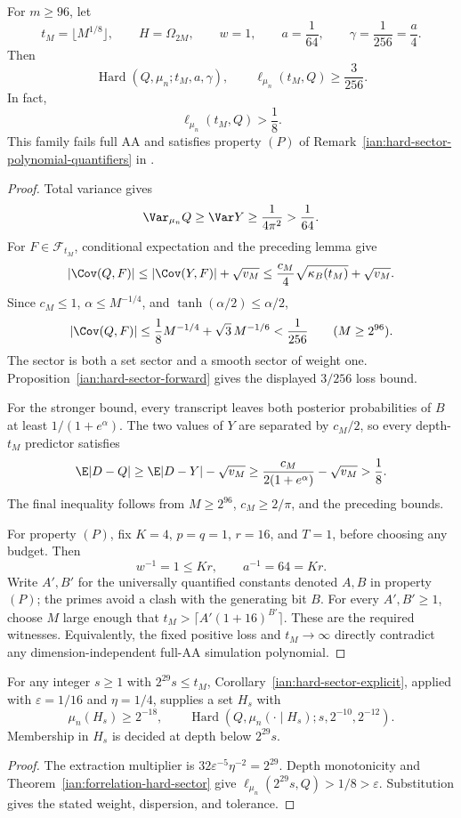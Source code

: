 \begin{theorem}\label{ian:forrelation-hard-sector}
For \(m\ge96\), let
\[
 t_M=\lfloor M^{1/8}\rfloor,\qquad
 H=\Omega_{2M},\qquad
 w=1,\qquad a=\frac1{64},\qquad\gamma=\frac1{256}=\frac a4.
\]
Then
\[
 \operatorname{Hard}(Q,\mu_n;t_M,a,\gamma),
 \qquad
 \ell_{\mu_n}(t_M,Q)\ge\frac3{256}.
\]
In fact,
\[
 \ell_{\mu_n}(t_M,Q)>\frac18.
\]
This family fails full AA and satisfies property \((P)\) of Remark~\ref{ian:hard-sector-polynomial-quantifiers} in
.
\end{theorem}
\begin{proof}
Total variance gives
\[
 \Var_{\mu_n}Q\ge\Var Y\ge\frac1{4\pi^2}>\frac1{64}.
\]
For \(F\in\mathcal F_{t_M}\), conditional expectation and the preceding lemma give
\[
 |\Cov(Q,F)|
 \le|\Cov(Y,F)|+\sqrt{v_M}
 \le\frac{c_M}{4}\sqrt{\kappa_B(t_M)}+\sqrt{v_M}.
\]
Since \(c_M\le1\), \(\alpha\le M^{-1/4}\), and
\(\tanh(\alpha/2)\le\alpha/2\),
\[
 |\Cov(Q,F)|
 \le\frac18M^{-1/4}+\sqrt3\,M^{-1/6}
 <\frac1{256}\qquad(M\ge2^{96}).
\]
The sector is both a set sector and a smooth sector of weight one.
Proposition~\ref{ian:hard-sector-forward} gives the displayed \(3/256\) loss bound.

For the stronger bound, every transcript leaves both posterior probabilities of \(B\) at least \(1/(1+e^\alpha)\). The two values of \(Y\) are separated by \(c_M/2\), so every depth-\(t_M\) predictor satisfies
\[
 \E|D-Q|
 \ge\E|D-Y|-\sqrt{v_M}
 \ge\frac{c_M}{2(1+e^\alpha)}-\sqrt{v_M}
 >\frac18.
\]
The final inequality follows from \(M\ge2^{96}\), \(c_M\ge2/\pi\), and the preceding bounds.

For property \((P)\), fix \(K=4\), \(p=q=1\), \(r=16\), and \(T=1\), before choosing any budget. Then
\[
 w^{-1}=1\le Kr,\qquad a^{-1}=64=Kr.
\]
Write \(A',B'\) for the universally quantified constants denoted \(A,B\) in property \((P)\); the primes avoid a clash with the generating bit \(B\).
For every \(A',B'\ge1\), choose \(M\) large enough that
\(t_M>\lceil A'(1+16)^{B'}\rceil\). These are the required witnesses. Equivalently, the fixed positive loss and \(t_M\to\infty\) directly contradict any dimension-independent full-AA simulation polynomial.
\end{proof}

\begin{corollary}\label{ian:forrelation-extraction}
For any integer \(s\ge1\) with \(2^{29}s\le t_M\), Corollary~\ref{ian:hard-sector-explicit}, applied with \(\varepsilon=1/16\) and \(\eta=1/4\), supplies a set \(H_s\) with
\[
 \mu_n(H_s)\ge2^{-18},\qquad
 \operatorname{Hard}(Q,\mu_n(\cdot\mid H_s);s,2^{-10},2^{-12}).
\]
Membership in \(H_s\) is decided at depth below \(2^{29}s\).
\end{corollary}
\begin{proof}
The extraction multiplier is
\(32\varepsilon^{-5}\eta^{-2}=2^{29}\).
Depth monotonicity and Theorem~\ref{ian:forrelation-hard-sector} give
\(\ell_{\mu_n}(2^{29}s,Q)>1/8>\varepsilon\).
Substitution gives the stated weight, dispersion, and tolerance.
\end{proof}

